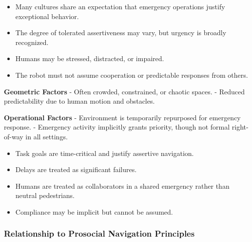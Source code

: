 \documentclass[utf8]{frontiers_suppmat} %
\providecommand{\tightlist}{%
  \setlength{\itemsep}{0pt}\setlength{\parskip}{0pt}}
\begin{document}
\begin{itemize}
\tightlist
\item
  Many cultures share an expectation that emergency operations justify
  exceptional behavior.
\item
  The degree of tolerated assertiveness may vary, but urgency is broadly
  recognized.
\end{itemize}

\label{diversity-context}

\begin{itemize}
\tightlist
\item
  Humans may be stressed, distracted, or impaired.
\item
  The robot must not assume cooperation or predictable responses from
  others.
\end{itemize}

\label{environmental-context}

\textbf{Geometric Factors} - Often crowded, constrained, or chaotic
spaces. - Reduced predictability due to human motion and obstacles.

\textbf{Operational Factors} - Environment is temporarily repurposed for
emergency response. - Emergency activity implicitly grants priority,
though not formal right-of-way in all settings.

\label{task-context}

\begin{itemize}
\tightlist
\item
  Task goals are time-critical and justify assertive navigation.
\item
  Delays are treated as significant failures.
\end{itemize}

\label{interpersonal-context}

\begin{itemize}
\tightlist
\item
  Humans are treated as collaborators in a shared emergency rather than
  neutral pedestrians.
\item
  Compliance may be implicit but cannot be assumed.
\end{itemize}

\subsubsection{Relationship to Prosocial Navigation
Principles}\label{relationship-to-prosocial-navigation-principles}
\end{document}
